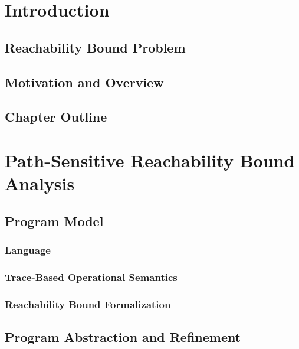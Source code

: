 \documentclass[12pt, letterpaper]{report}   %
\begin{document}
\chapter{Introduction }
\label{sec:reachability-intro}
\section{Reachability Bound Problem}
\label{sec:reachability-background}

\section{Motivation and Overview}
\label{sec:reachability-motivation}

\section{Chapter Outline}
\label{sec:reachability-outline}

\chapter{Path-Sensitive Reachability Bound Analysis}
\label{sec:reachability-analysis}

\section{{Program Model}}
\label{sec:language}
\subsection{Language}
\subsection{Trace-Based Operational Semantics}
% 
\subsection{{Reachability Bound Formalization}}
\label{sec:execution_rb}
% 
% 
\section{Program Abstraction and Refinement}
\label{sec:reachability-program_refine}
\end{document}
